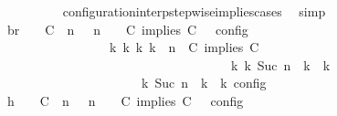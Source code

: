 \begin{isabellebody}
\ \ \ \ \ \ \ \ \isamarkupfalse%
\ configuration{\isacharunderscore}interp{\isacharunderscore}stepwise{\isacharunderscore}implies{\isacharunderscore}cases\ \isamarkupfalse%
\ simp\isanewline
\ \ \ \ \ \ \isamarkupfalse%
\ \isamarkupfalse%
\ br{}{\isacharcolon}\ {\isacartoucheopen}{\isasymrho}\ {\isasymin}\ {\isasymlbrakk}\ {\isacharparenleft}{\isacharparenleft}C\ {\isasymnot}{\isasymUp}\ n{\isacharparenright}\ {\isacharhash}\ {\isasymGamma}{\isacharparenright}{\isacharcomma}\ n\ {\isasymturnstile}\ {\isasymPsi}\ {\isasymtriangleright}\ {\isacharparenleft}{\isacharparenleft}C\ implies\ C\ {\isacharhash}\ {\isasymPhi}{\isacharparenright}\ {\isasymrbrakk}\isactrlsub c\isactrlsub o\isactrlsub n\isactrlsub f\isactrlsub i\isactrlsub g\isanewline
\ \ \ \ \ \ \ \ \ \ \ \ \ \ \ \ {\isasymLongrightarrow}\ {\isasymexists}{\isasymGamma}\isactrlsub k\ {\isasymPsi}\isactrlsub k\ {\isasymPhi}\isactrlsub k\ k{\isachardot}\ {\isacharparenleft}{\isacharparenleft}{\isasymGamma}{\isacharcomma}\ n\ {\isasymturnstile}\ {\isacharparenleft}{\isacharparenleft}C\ implies\ C\ {\isacharhash}\ {\isasymPsi}{\isacharparenright}\ {\isasymtriangleright}\ {\isasymPhi}{\isacharparenright}\isanewline
\ \ \ \ \ \ \ \ \ \ \ \ \ \ \ \ \ \ \ \ \ \ \ \ \ \ \ \ \ \ \ \ \ \ \ \ {\isasymhookrightarrow}\isactrlbsup k\isactrlesup \ {\isacharparenleft}{\isasymGamma}\isactrlsub k{\isacharcomma}\ Suc\ n\ {\isasymturnstile}\ {\isasymPsi}\isactrlsub k\ {\isasymtriangleright}\ {\isasymPhi}\isactrlsub k{\isacharparenright}{\isacharparenright}\isanewline
\ \ \ \ \ \ \ \ \ \ \ \ \ \ \ \ \ \ {\isasymand}\ {\isasymrho}\ {\isasymin}\ {\isasymlbrakk}\ {\isasymGamma}\isactrlsub k{\isacharcomma}\ Suc\ n\ {\isasymturnstile}\ {\isasymPsi}\isactrlsub k\ {\isasymtriangleright}\ {\isasymPhi}\isactrlsub k\ {\isasymrbrakk}\isactrlsub c\isactrlsub o\isactrlsub n\isactrlsub f\isactrlsub i\isactrlsub g{\isacartoucheclose}\isanewline
\ \ \ \ \ \ \isamarkupfalse%
\ {\isacharminus}\isanewline
\ \ \ \ \ \ \ \ \isamarkupfalse%
\ h{}{\isacharcolon}\ {\isacartoucheopen}{\isasymrho}\ {\isasymin}\ {\isasymlbrakk}\ {\isacharparenleft}{\isacharparenleft}C\ {\isasymnot}{\isasymUp}\ n{\isacharparenright}\ {\isacharhash}\ {\isasymGamma}{\isacharparenright}{\isacharcomma}\ n\ {\isasymturnstile}\ {\isasymPsi}\ {\isasymtriangleright}\ {\isacharparenleft}{\isacharparenleft}C\ implies\ C\ {\isacharhash}\ {\isasymPhi}{\isacharparenright}\ {\isasymrbrakk}\isactrlsub c\isactrlsub o\isactrlsub n\isactrlsub f\isactrlsub i\isactrlsub g{\isacartoucheclose}\isanewline

\end{isabellebody}
